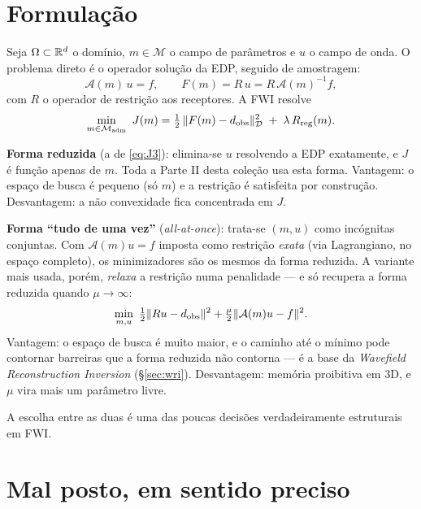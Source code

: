 \documentclass[11pt,a4paper,oneside]{report}
\begin{document}
\section{Formula\c{c}\~ao}

Seja $\Omega \subset \mathbb{R}^{d}$ o dom\'inio, $m \in \mathcal{M}$ o campo de
par\^ametros e $u$ o campo de onda. O problema direto \'e o operador solu\c{c}\~ao
da EDP, seguido de amostragem:
\begin{equation}
\mathcal{A}(m)\,u = f,
\qquad
F(m) = R\,u = R\,\mathcal{A}(m)^{-1} f ,
\end{equation}
com $R$ o operador de restri\c{c}\~ao aos receptores. A FWI resolve
\begin{equation}
\min_{m\in\mathcal{M}_{\text{adm}}}\ J(m)
 = \tfrac12\,\lVert F(m) - d_{\text{obs}} \rVert_{\mathcal{D}}^{2}
 \;+\; \lambda\,R_{\text{reg}}(m) .
\label{eq:J3}
\end{equation}

\begin{teoria}
\textbf{Forma reduzida} (a de \eqref{eq:J3}): elimina-se $u$ resolvendo a EDP
exatamente, e $J$ \'e fun\c{c}\~ao apenas de $m$. Toda a Parte II desta
cole\c{c}\~ao usa esta forma. Vantagem: o espa\c{c}o de busca \'e pequeno
(s\'o $m$) e a restri\c{c}\~ao \'e satisfeita por constru\c{c}\~ao.
Desvantagem: a n\~ao convexidade fica concentrada em $J$.

\textbf{Forma ``tudo de uma vez''} (\emph{all-at-once}): trata-se $(m,u)$ como
inc\'ognitas conjuntas. Com $\mathcal{A}(m)u = f$ imposta como restri\c{c}\~ao
\emph{exata} (via Lagrangiano, no espa\c{c}o completo), os minimizadores s\~ao os
mesmos da forma reduzida. A variante mais usada, por\'em, \emph{relaxa} a
restri\c{c}\~ao numa penalidade --- e s\'o recupera a forma reduzida quando
$\mu\to\infty$:
\[
\min_{m,u}\ \tfrac12\norm{Ru-d_{\text{obs}}}^{2}
 + \tfrac{\mu}{2}\norm{\mathcal{A}(m)u - f}^{2} .
\]
Vantagem: o espa\c{c}o de busca \'e muito maior, e o caminho at\'e o
m\'inimo pode contornar barreiras que a forma reduzida n\~ao contorna --- \'e
a base da \emph{Wavefield Reconstruction Inversion} (§\ref{sec:wri}).
Desvantagem: mem\'oria proibitiva em 3D, e $\mu$ vira mais um par\^ametro
livre.

A escolha entre as duas \'e uma das poucas decis\~oes verdadeiramente
estruturais em FWI.
\end{teoria}

\section{Mal posto, em sentido preciso}
\end{document}
